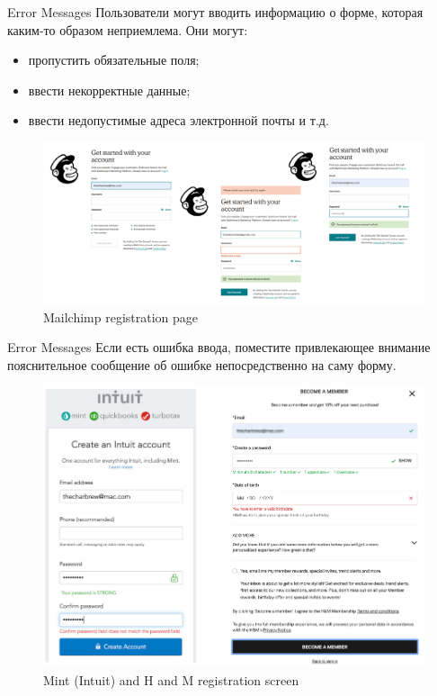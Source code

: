 \documentclass{beamer}
\begin{document}
\begin{frame}[t]{Error Messages}
	Пользователи могут вводить информацию о форме, которая каким-то образом неприемлема. Они могут:
	\begin{itemize}
		\item пропустить обязательные поля; 
		\item ввести некорректные данные;
		\item ввести недопустимые адреса электронной почты и т.д.
	\end{itemize}
	\begin{figure}[h]
		\centering
		\includegraphics[scale=0.3]{images/lec08-pic63.png}
		\caption{Mailchimp registration page}
	\end{figure}
\end{frame}

\begin{frame}[t]{Error Messages}
	Если есть ошибка ввода, поместите привлекающее внимание пояснительное сообщение об ошибке непосредственно на саму форму.
	\begin{figure}[h]
		\centering
		\includegraphics[scale=0.3]{images/lec08-pic64.png}
		\caption{Mint (Intuit) and H and M registration screen}
	\end{figure}
\end{frame}
\end{document}
